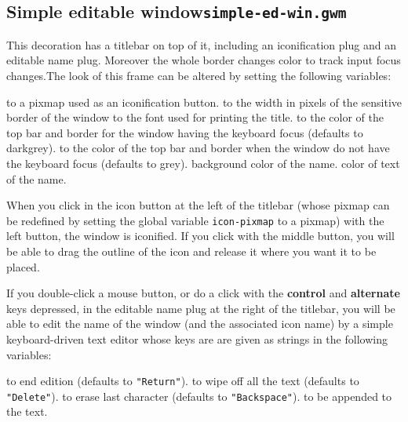 \subsection{Simple editable window\hfill{\tt simple-ed-win.gwm}}
\label{simple-ed-win}

\centerline{}

This decoration has a titlebar on top of it, including an iconification
plug and an editable name plug. Moreover the whole border changes color to
track input focus changes.The look of this
frame can be altered by setting the following variables:

\begin{description}
 to a pixmap used as an iconification button.
 to the width in pixels of the 
sensitive border of the window
 to the font used for printing the title.
 to the color of the top bar and border
 for the window having the keyboard focus (defaults to darkgrey).
 to the color of the top bar and border
when the window do not have the keyboard focus (defaults to grey).
 background color of the name.
 color of text of the name.
\end{description}

When you click in the icon button at the left of the titlebar (whose pixmap
can be redefined by setting the global variable \verb"icon-pixmap" to a
pixmap) with the left button, the window is iconified. If you click with the
middle button, you will be able to drag the outline of the icon and release
it where you want it to be placed.

If you double-click a mouse button, or do a click with the {\bf control} and
{\bf alternate} keys depressed, in the editable name plug at the right of
the titlebar, you will be able to edit the name of the window (and the
associated icon name) by a simple keyboard-driven text editor whose keys
are are given as strings in the following variables:

\begin{description}
 to end edition (defaults to \verb|"Return"|).
 to wipe off all the text (defaults to 
\verb|"Delete"|).
 to erase last character (defaults to 
\verb|"Backspace"|).
 to be appended to the text.
\end{description}

